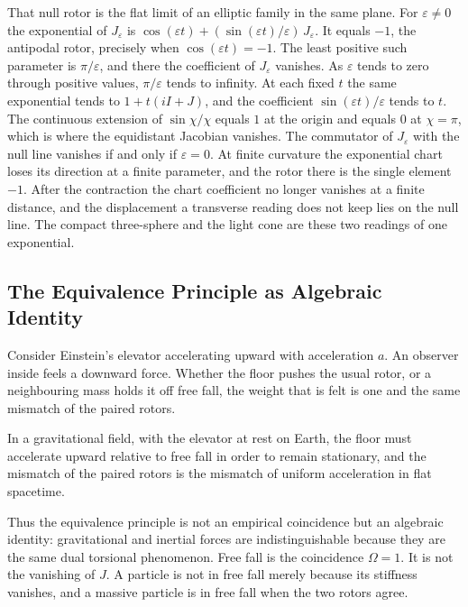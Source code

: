 \documentclass[a4paper]{article}
\begin{document}
That null rotor is the flat limit of an elliptic family in the same plane. For $\varepsilon\neq 0$ the exponential of $J_\varepsilon$ is $\cos(\varepsilon t)+(\sin(\varepsilon t)/\varepsilon)\,J_\varepsilon$. It equals $-1$, the antipodal rotor, precisely when $\cos(\varepsilon t)=-1$. The least positive such parameter is $\pi/\varepsilon$, and there the coefficient of $J_\varepsilon$ vanishes. As $\varepsilon$ tends to zero through positive values, $\pi/\varepsilon$ tends to infinity. At each fixed $t$ the same exponential tends to $1+t(iI+J)$, and the coefficient $\sin(\varepsilon t)/\varepsilon$ tends to $t$. The continuous extension of $\sin\chi/\chi$ equals $1$ at the origin and equals $0$ at $\chi=\pi$, which is where the equidistant Jacobian vanishes. The commutator of $J_\varepsilon$ with the null line vanishes if and only if $\varepsilon=0$. At finite curvature the exponential chart loses its direction at a finite parameter, and the rotor there is the single element $-1$. After the contraction the chart coefficient no longer vanishes at a finite distance, and the displacement a transverse reading does not keep lies on the null line. The compact three-sphere and the light cone are these two readings of one exponential.

\subsection{The Equivalence Principle as Algebraic Identity}

Consider Einstein's elevator accelerating upward with acceleration $a$. An observer inside feels a downward force. Whether the floor pushes the usual rotor, or a neighbouring mass holds it off free fall, the weight that is felt is one and the same mismatch of the paired rotors.

In a gravitational field, with the elevator at rest on Earth, the floor must accelerate upward relative to free fall in order to remain stationary, and the mismatch of the paired rotors is the mismatch of uniform acceleration in flat spacetime.

Thus the equivalence principle is not an empirical coincidence but an algebraic identity: gravitational and inertial forces are indistinguishable because they are the same dual torsional phenomenon. Free fall is the coincidence $\Omega=1$. It is not the vanishing of $J$. A particle is not in free fall merely because its stiffness vanishes, and a massive particle is in free fall when the two rotors agree.
\end{document}
